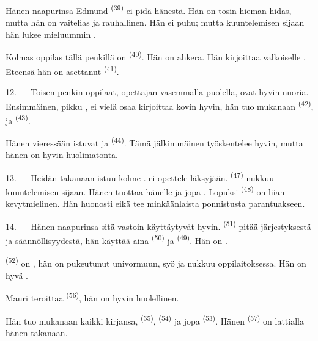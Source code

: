 Hänen naapurinsa Edmund \textsuperscript{(39)} ei pidä hänestä. Hän on tosin
hieman hidas, mutta hän on vaitelias ja rauhallinen. Hän ei puhu; mutta
kuuntelemisen sijaan hän lukee mieluummin 
.

Kolmas oppilas tällä penkillä on  \textsuperscript{(40)}. Hän on
ahkera. Hän kirjoittaa valkoiselle . Eteensä hän on
asettanut  \textsuperscript{(41)}.

12. --- Toisen penkin oppilaat, opettajan vasemmalla puolella, ovat hyvin
nuoria. Ensimmäinen, pikku , ei vielä osaa kirjoittaa kovin hyvin,
hän tuo mukanaan  \textsuperscript{(42)},
 ja  \textsuperscript{(43)}.

Hänen vieressään istuvat  ja 
\textsuperscript{(44)}. Tämä jälkimmäinen työskentelee hyvin, mutta hänen
 on hyvin huolimatonta.

13. --- Heidän takanaan istuu kolme .  ei
opettele läksyjään.  \textsuperscript{(47)} nukkuu kuuntelemisen
sijaan. Hänen  tuottaa hänelle  ja jopa
. Lopuksi  \textsuperscript{(48)} on
liian kevytmielinen. Hän  huonosti eikä tee minkäänlaista
ponnistusta parantuakseen.

14. --- Hänen naapurinsa sitä vastoin käyttäytyvät hyvin. 
\textsuperscript{(51)} pitää järjestyksestä ja säännöllisyydestä, hän käyttää
aina  \textsuperscript{(50)} ja 
\textsuperscript{(49)}. Hän on .

 \textsuperscript{(52)} on , hän on
pukeutunut univormuun, syö ja nukkuu oppilaitoksessa. Hän on hyvä
.

Mauri teroittaa  
\textsuperscript{(56)}, hän on hyvin huolellinen.

Hän tuo mukanaan kaikki kirjansa,  \textsuperscript{(55)},
 \textsuperscript{(54)} ja jopa
 \textsuperscript{(53)}. Hänen
 \textsuperscript{(57)} on lattialla hänen takanaan.

